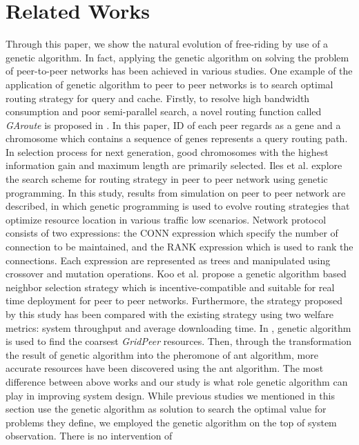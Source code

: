 \documentclass[12pt,journal,draftcls,letterpaper,onecolumn]{IEEEtran}
\begin{document}
\section{Related Works}\label{sec:related}

Through this paper, we show the natural evolution of free-riding by use of a genetic
algorithm. In fact, applying the genetic algorithm on solving the problem of peer-to-peer
networks has been achieved in various studies. One example of the application of genetic
algorithm to peer to peer networks is to search optimal routing strategy for query and cache.
Firstly, to resolve high bandwidth consumption and poor semi-parallel search, a novel routing
function called \emph{GAroute} is proposed in \cite{WWW05}. In this paper, ID of each peer regards as a gene
and a chromosome which contains a sequence of genes represents a query routing path. In
selection process for next generation, good chromosomes with the highest information gain
and maximum length are primarily selected. Iles et al.\cite{SRDS02} explore the search scheme for
routing strategy in peer to peer network using genetic programming. In this study, results
from simulation on peer to peer network are described, in which genetic programming is used
to evolve routing strategies that optimize resource location in various traffic low scenarios.
Network protocol consists of two expressions: the CONN expression which specify the
number of connection to be maintained, and the RANK expression which is used to rank the
connections. Each expression are represented as trees and manipulated using crossover and
mutation operations.
Koo et al.\cite{ns:neighbor} propose a genetic algorithm based neighbor selection strategy which is
incentive-compatible and suitable for real time deployment for peer to peer networks.
Furthermore, the strategy proposed by this study has been compared with the existing
strategy using two welfare metrics: system throughput and average downloading time. In \cite{IIHMSP07},
genetic algorithm is used to find the coarsest \emph{GridPeer} resources. Then, through the
transformation the result of genetic algorithm into the pheromone of ant algorithm, more
accurate resources have been discovered using the ant algorithm.
The most difference between above works and our study is what role genetic algorithm can
play in improving system design. While previous studies we mentioned in this section use the
genetic algorithm as solution to search the optimal value for problems they define, we
employed the genetic algorithm on the top of system observation. There is no intervention of
\end{document}

